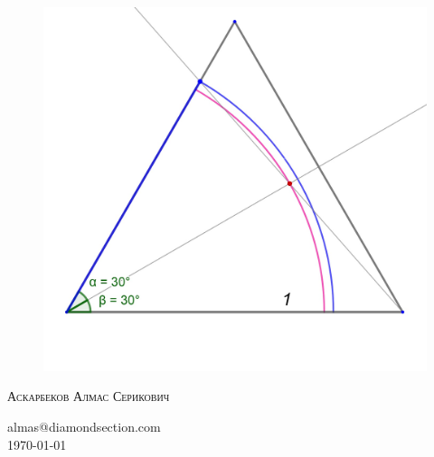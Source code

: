 \documentclass[12pt, letterpaper, oneside]{report}
\begin{document}
\begin{titlepage}
\begin{figure}[h]
\centerline{\includegraphics[scale=0.2]{images/ds_tr.jpg}}

\label{logo}
\end{figure}
\textsc{\LARGE Аскарбеков Алмас Серикович }\\[1.5cm]
\begin{center}
	\large {almas@diamondsection.com}\\
	\today
\end{center}
\end{titlepage}
\end{document}
